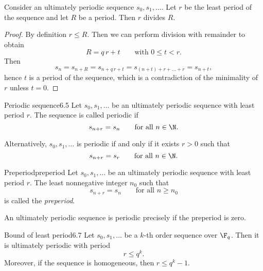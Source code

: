 \begin{lem}\label{6.4}
	Consider an ultimately periodic sequence \(s_0,s_1,\ldots\). Let \(r\) be the least period of the sequence and let \(R\) be a period. Then \(r\) divides \(R\).
\end{lem}

\begin{proof}
	By definition \(r \le R\). Then we can perform division with remainder to obtain
	\[
		R = q\,r + t \qquad\text{with }0 \le t < r.
	\]
	Then
	\[
		s_n = s_{n+R} = s_{n+q\,r+t} = s_{(n+t)+r+\ldots+r} = s_{n+t},
	\]
	hence \(t\) is a period of the sequence, which is a contradiction of the minimality of \(r\) unless \(t=0\).
\end{proof}

\begin{defn}{Periodic sequence}{6.5}
	Let \(s_0,s_1,\ldots\) be an ultimately periodic sequence with least period \(r\). The sequence is called periodic if
	\[
		s_{n+r} = s_{n} \qquad\text{for all }n\in\N.
	\]
\end{defn}

\begin{oss}
	Alternatively, \(s_0,s_1,\ldots\) is periodic if and only if it exists \(r>0\) such that
	\[
		s_{n+r} = s_r \qquad\text{for all }n \in \N.
	\]
\end{oss}

\begin{defn}{Preperiod}{preperiod}
	Let \(s_0,s_1,\ldots\) be an ultimately periodic sequence with least period \(r\). The least nonnegative integer \(n_0\) such that
	\[
		s_{n+r} = s_n \qquad\text{for all }n \ge n_0
	\]
	is called the \emph{preperiod}.
\end{defn}

\begin{oss}
	An ultimately periodic sequence is periodic precisely if the preperiod is zero.
\end{oss}

\begin{teor}{Bound of least period}{6.7}
	Let \(s_0,s_1,\ldots\) be a \(k\)-th order sequence over \(\F_q\). Then it is ultimately periodic with period
	\[
		r \le q^k.
	\]
	Moreover, if the sequence is homogeneous, then \(r \le q^k-1\).
\end{teor}

